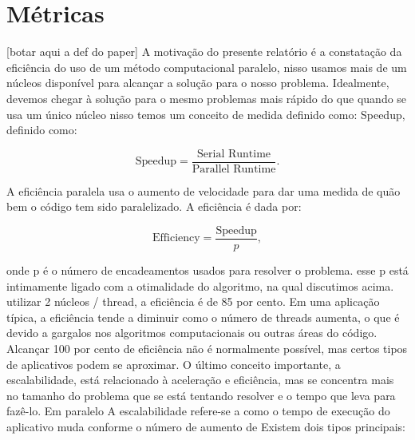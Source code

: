 \documentclass[letterpaper, 10 pt, conference]{ieeeconf}
\begin{document}
\section{Métricas}

[botar aqui a def do paper]
A motivação do presente relatório é a constatação da eficiência do uso de um método computacional paralelo, nisso
usamos mais de um núcleos disponível para alcançar a solução para o nosso problema. Idealmente, devemos chegar à solução 
para o mesmo problemas mais rápido do que quando se usa um único núcleo nisso temos um conceito de medida definido como: 
Speedup, definido como:
 
\begin{equation*}\text{Speedup} = \frac{\text{Serial Runtime}}{\text{Parallel Runtime}}.\end{equation*}

A eficiência paralela usa o aumento de velocidade para dar uma medida de quão bem o código tem sido paralelizado. A eficiência é dada por:

\begin{equation*}\text{Efficiency} = \frac{\text{Speedup}}{p},\end{equation*}

onde p é o número de encadeamentos usados para resolver o problema. esse p está intimamente ligado com a otimalidade do algoritmo, na qual discutimos acima.  utilizar 2 núcleos / thread, a eficiência é de 85 por cento. Em uma aplicação típica, a eficiência tende a diminuir como o número de threads aumenta, o que é devido a gargalos nos algoritmos computacionais ou outras áreas do código. Alcançar 100 por cento de eficiência não é normalmente possível, mas certos tipos de aplicativos podem se aproximar. 
O último conceito importante, a escalabilidade, está relacionado à aceleração e eficiência, mas se concentra mais no tamanho do problema que se está tentando resolver e o tempo que leva para fazê-lo. Em paralelo A escalabilidade refere-se a como o tempo de execução do aplicativo muda conforme o número de aumento de Existem dois tipos principais:\\
\end{document}
